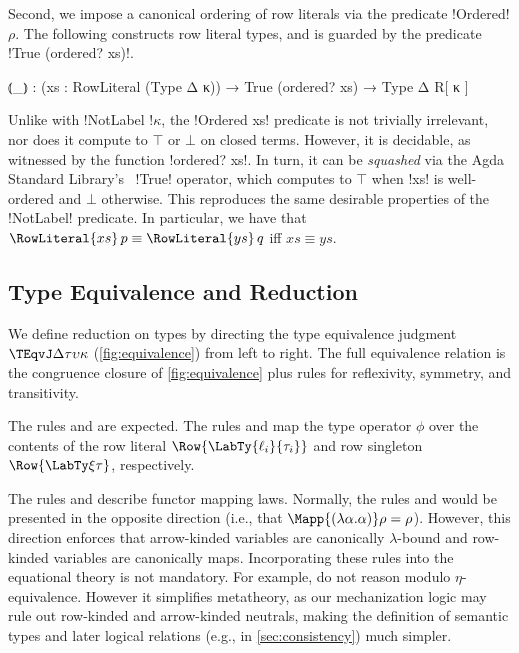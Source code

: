 Second, we impose a canonical ordering of row literals via the predicate !Ordered! $\rho$. The following constructs row literal types, and is guarded by the predicate !True (ordered? xs)!.

\begin{code}
    ⦅_⦆ : (xs : RowLiteral (Type Δ κ)) → True (ordered? xs) →
          Type Δ R[ κ ]
\end{code}

\Ni Unlike with !NotLabel !$\kappa$, the !Ordered xs! predicate is not trivially irrelevant, nor does it compute to $\top$ or $\bot$ on closed terms. However, it is decidable, as witnessed by the function !ordered? xs!. In turn, it can be \emph{squashed} via the Agda Standard Library's~\citep{AgdaStdLib} !True! operator, which computes to $\top$ when !xs! is well-ordered and $\bot$ otherwise. This reproduces the same desirable properties of the !NotLabel! predicate. In particular, we have that $\RowLiteral{xs}\, p \equiv \RowLiteral{ys}\, q$ iff $xs \equiv ys$.


\subsection{Type Equivalence and Reduction}
\label{sec:type-equivalence}

\InlineOff{}

\InlineOn{}

We define reduction on types by directing the type equivalence judgment $\TEqvJ \Delta \tau {\upsilon} \kappa$ (\cref{fig:equivalence}) from left to right. The full equivalence relation is the congruence closure of \cref{fig:equivalence} plus rules for reflexivity, symmetry, and transitivity. 

The rules \erule{$\beta$} and \erule{$\eta$} are expected. The rules  and  map the type operator $\phi$ over the contents of the row literal $\Row{\LabTy {\ell_i} {\tau_i}}$ and row singleton $\Row{\LabTy \xi \tau}$, respectively.

The rules  and  describe functor mapping laws. Normally, the rules \erule{$\eta$} and  would be presented in the opposite direction (i.e., that $\Mapp {(\lambda \alpha. \alpha)} \rho = \rho$). However, this direction enforces that arrow-kinded variables are canonically $\lambda$-bound and row-kinded variables are canonically maps. Incorporating these rules into the equational theory is not mandatory. For example, \citet{ChapmanKNW19} do not reason modulo $\eta$-equivalence. However it simplifies metatheory, as our mechanization logic may rule out row-kinded and arrow-kinded neutrals, making the definition of semantic types and later logical relations (e.g., in \cref{sec:consistency}) much simpler.

